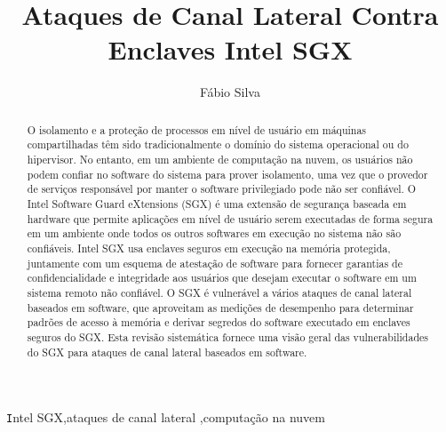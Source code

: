 \documentclass[review]{elsarticle}
\begin{document}
\begin{frontmatter}

\title{Ataques de Canal Lateral Contra Enclaves Intel SGX}

\author{Fábio Silva}
\address{Laboratório de Sistemas Distribuídos\\Universidade Federal de Campina Grande}




\begin{abstract}
O isolamento e a proteção de processos em nível de usuário em máquinas compartilhadas têm sido tradicionalmente o domínio do sistema operacional ou do hipervisor. No entanto, em um ambiente de computação na nuvem, os usuários não podem confiar no software do sistema para prover isolamento, uma vez que o provedor de serviços responsável por manter o software privilegiado pode não ser confiável. O Intel Software Guard eXtensions (SGX) é uma extensão de segurança baseada em hardware que permite aplicações em nível de usuário serem executadas de forma segura em um ambiente onde todos os outros softwares em execução no sistema não são confiáveis. Intel SGX usa enclaves seguros em execução na memória protegida, juntamente com um esquema de atestação de software para fornecer garantias de confidencialidade e integridade aos usuários que desejam executar o software em um sistema remoto não confiável. O SGX é vulnerável a vários ataques de canal lateral baseados em software, que aproveitam as medições de desempenho para determinar padrões de acesso à memória e derivar segredos do software executado em enclaves seguros do SGX. Esta revisão sistemática fornece uma visão geral das vulnerabilidades do SGX para ataques de canal lateral baseados em software.
\end{abstract}

\begin{keyword}
\texttt Intel SGX\sep ataques de canal lateral \sep computação na nuvem
\end{keyword}

\end{frontmatter}
\end{document}
